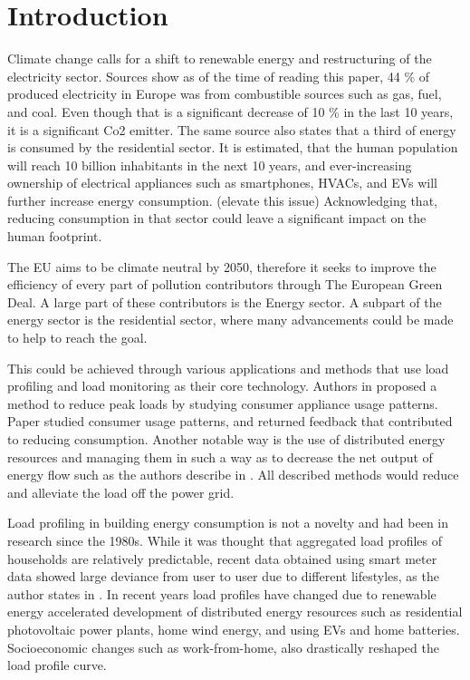 \label{chapter1}
\chapter{Introduction}

Climate change calls for a shift to renewable energy and restructuring of the electricity sector.
Sources \cite{eurostat2020} show as of the time of reading this paper, 44 \% of produced electricity in Europe was from combustible sources such as gas, fuel, and coal. Even 
though that is a significant decrease of 10 \% in the last 10 years, it is a significant Co2 emitter.
The same source \cite{eurostat2020} also states that a third of energy is consumed by the residential sector. It is estimated, 
that the human population will reach 10 billion inhabitants in the next 10 years, and ever-increasing ownership of electrical appliances such as smartphones, HVACs, and EVs will further increase energy consumption. (elevate this issue)
Acknowledging that, reducing consumption in that sector could leave a significant impact on the human footprint. 


The EU aims to be climate neutral by 2050, therefore it seeks to improve the efficiency of every part of pollution contributors through The European Green Deal.
A large part of these contributors is the Energy sector.
A subpart of the energy sector is the residential sector, where many advancements could be made to help to reach the goal.  

This could be achieved through various applications and methods that use load profiling and load monitoring as their core technology.
Authors in \cite{Chuan2014} proposed a method to reduce peak loads by studying consumer
appliance usage patterns. Paper \cite{Csoknyai2019} studied consumer usage patterns, and returned feedback that contributed to reducing consumption.
Another notable way is the use of distributed energy resources and managing them in such a way as to decrease the net output of energy flow such as the authors describe in
\cite{MORENOJARAMILLO2021445}. All described methods would reduce and alleviate the load off the power grid.


Load profiling in building energy consumption is not a novelty and had been in research since the 1980s.
While it was thought that aggregated load profiles of households are relatively predictable, recent data obtained using smart meter data showed large deviance from user to user due to different lifestyles, as the author states in \cite{Review2021}.
In recent years load profiles have changed due to renewable energy accelerated development of distributed energy resources such as residential photovoltaic
power plants, home wind energy, and using EVs and home batteries. Socioeconomic changes such as work-from-home, also drastically reshaped the load profile curve. 

